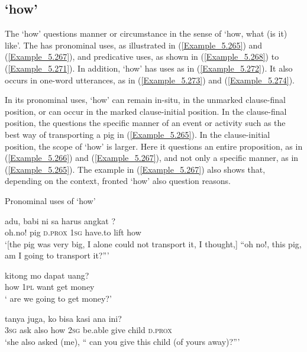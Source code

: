 \subsection{ ‘how’}
\label{Para_5.8.4}
The   ‘how’ questions manner or circumstance in the sense of ‘how, what (is it) like’. The  has pronominal uses, as illustrated in (\ref{Example_5.265}) and (\ref{Example_5.267}), and predicative uses, as shown in (\ref{Example_5.268}) to (\ref{Example_5.271}). In addition,  ‘how’ has  uses as in (\ref{Example_5.272}). It also occurs in one-word utterances, as in (\ref{Example_5.273}) and (\ref{Example_5.274}).

In its pronominal uses,  ‘how’ can remain in-situ, in the unmarked clause-final position, or can occur in the marked clause-initial position. In the clause-final position, the  questions the specific manner of an event or activity such as the best way of transporting a pig in (\ref{Example_5.265}). In the clause-initial position, the scope of  ‘how’ is larger. Here it questions an entire proposition, as in (\ref{Example_5.266}) and (\ref{Example_5.267}), and not only a specific manner, as in (\ref{Example_5.265}). The example in (\ref{Example_5.267}) also shows that, depending on the context, fronted  ‘how’ also question reasons.


\begin{styleExampleTitle}
Pronominal uses of  ‘how’
\end{styleExampleTitle}

\ea
\label{Example_5.265}
\gll {{\ldots}} {adu,} {babi} {ni} {sa} {harus} {angkat} {?}\\ %
 { }   oh.no!  pig  \textsc{d.prox}  \textsc{1sg}  have.to  lift  how\\
\glt 
‘[the pig was very big, I alone could not transport it, I thought,] ``oh no!, this pig,  am I going to transport it?''' \textstyleExampleSource{[080919-003-NP.0008]}
\z

\ea
\label{Example_5.266}
 {kitong} {mo} {dapat} {uang?}\\ %
 how  \textsc{1pl}  want  get  money\\
\glt 
‘ are we going to get money?’ \textstyleExampleSource{[080927-006-CvNP.0041]}
\z

\ea
\label{Example_5.267}
 {tanya} {juga,} {} {ko} {bisa} {kasi} {ana} {ini?}\\ %
 \textsc{3sg}  ask  also  how  \textsc{2sg}  be.able  give  child  \textsc{d.prox}\\
 ‘she also asked (me), `` can you give this child (of yours away)?''' \textstyleExampleSource{[081006-026-CvEx.0003]}
\z


